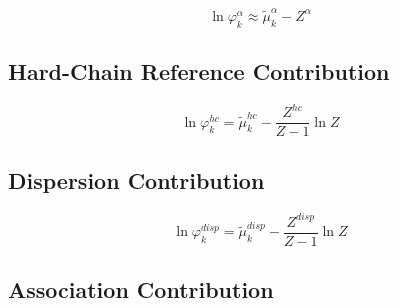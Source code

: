 \documentclass[12pt, letterpaper]{article}
\begin{document}
\begin{equation}
    \ln\varphi_{k}^{\alpha}
    \approx
    \tilde{\mu}_{k}^{\alpha}
    -
    Z^{\alpha}
    \label{eq:lnphi_alpha_near_ideal}
\end{equation}

\subsection{Hard-Chain Reference Contribution}


\begin{equation}
    \ln\varphi_{k}^{hc}
    =
    \tilde{\mu}_{k}^{hc}
    -
    \frac{Z^{hc}}{Z-1}\ln Z
    \label{eq:lnphi_hc}
\end{equation}

\subsection{Dispersion Contribution}


\begin{equation}
    \ln\varphi_{k}^{disp}
    =
    \tilde{\mu}_{k}^{disp}
    -
    \frac{Z^{disp}}{Z-1}\ln Z
    \label{eq:lnphi_disp}
\end{equation}

\subsection{Association Contribution}

\end{document}
